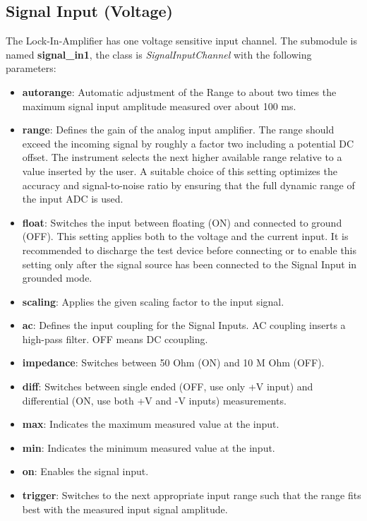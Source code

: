 \documentclass[11pt]{article} %
\begin{document}
\subsection{Signal Input (Voltage)}
The Lock-In-Amplifier has one voltage sensitive input channel. The submodule is named {\bf signal\_in1}, the class is {\it SignalInputChannel} with the following parameters:
\begin{itemize}
\item {\bf autorange}: Automatic adjustment of the Range to about two times the maximum signal input amplitude measured over about 100 ms.
\item {\bf range}: Defines the gain of the analog input amplifier. The range should exceed the incoming signal by roughly a factor two including a potential DC offset. The instrument selects the next higher available range relative to a value inserted by the user. A suitable choice of this setting optimizes the accuracy and signal-to-noise ratio by ensuring that the full dynamic range of the input ADC is used.
\item {\bf float}: Switches the input between floating (ON) and connected to ground (OFF). This setting applies both to the voltage and the current input. It is recommended to discharge the test device before connecting or to enable this setting only after the signal source has been connected to the Signal Input in grounded mode.
\item {\bf scaling}: Applies the given scaling factor to the input signal.
\item {\bf ac}: Defines the input coupling for the Signal Inputs. AC coupling inserts a high-pass filter. OFF means DC ccoupling.
\item {\bf impedance}: Switches between 50 Ohm (ON) and 10 M Ohm (OFF).
\item {\bf diff}: Switches between single ended (OFF, use only +V input) and differential (ON, use both +V and -V inputs) measurements.
\item {\bf max}: Indicates the maximum measured value at the input.
\item {\bf min}: Indicates the minimum measured value at the input.
\item {\bf on}: Enables the signal input.
\item {\bf trigger}: Switches to the next appropriate input range such that the range fits best with the measured input signal amplitude.
\end{itemize}
\end{document}
